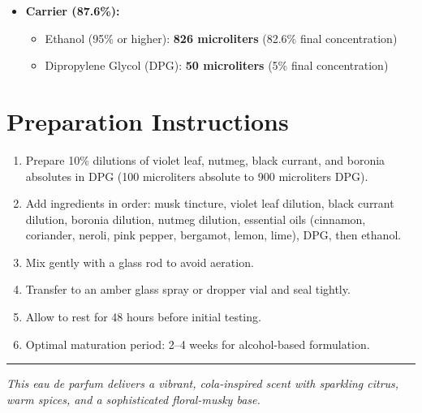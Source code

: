 \documentclass{article}
\begin{document}
\begin{itemize}[leftmargin=*]
  \item \textcolor{colaRed}{\textbf{Carrier (87.6\%):}}
  \begin{itemize}
    \item Ethanol (95\% or higher): \textbf{826 microliters} (82.6\% final concentration)
    \item Dipropylene Glycol (DPG): \textbf{50 microliters} (5\% final concentration)
  \end{itemize}
\end{itemize}

\section*{Preparation Instructions}
\begin{enumerate}
  \item Prepare 10\% dilutions of violet leaf, nutmeg, black currant, and boronia absolutes in DPG (100 microliters absolute to 900 microliters DPG).
  \item Add ingredients in order: musk tincture, violet leaf dilution, black currant dilution, boronia dilution, nutmeg dilution, essential oils (cinnamon, coriander, neroli, pink pepper, bergamot, lemon, lime), DPG, then ethanol.
  \item Mix gently with a glass rod to avoid aeration.
  \item Transfer to an amber glass spray or dropper vial and seal tightly.
  \item Allow to rest for 48 hours before initial testing.
  \item Optimal maturation period: 2--4 weeks for alcohol-based formulation.
\end{enumerate}

\vspace{1cm}
\begin{center}
\textcolor{colaBrown}{\rule{0.8\textwidth}{0.4pt}}
\end{center}

\begin{center}
\textit{\textcolor{colaDark}{This eau de parfum delivers a vibrant, cola-inspired scent with sparkling citrus, warm spices, and a sophisticated floral-musky base.}}
\end{center}
\end{document}

